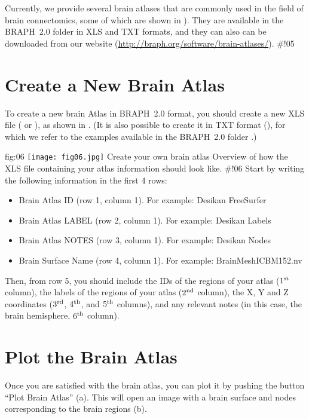 \documentclass[justified]{tufte-handout}
\begin{document}
Currently, we provide several brain atlases that are commonly used in the field of brain connectomics, some of which are shown in ). 
They are available in the BRAPH~2.0 folder  in XLS and TXT formats, and they can also can be downloaded from our website (\url{http://braph.org/software/brain-atlases/}).
#!05
\clearpage
\section{Create a New Brain Atlas}

To create a new brain Atlas in BRAPH~2.0 format, you should create a new XLS file ( or ), as shown in . 
(It is also possible to create it in TXT format (), for which we refer to the examples available in the BRAPH~2.0 folder .)

	{fig:06}
	{\texttt{[image: fig06.jpg]}}
	{Create your own brain atlas}
	{
	Overview of how the XLS file containing your atlas information should look like.
	}
#!06
Start by writing the following information in the first 4 rows:
\begin{itemize}

\item Brain Atlas ID (row 1, column 1). 
For example: Desikan FreeSurfer

\item Brain Atlas LABEL (row 2, column 1). 
For example: Desikan Labels

\item Brain Atlas NOTES (row 3, column 1).
For example: Desikan Nodes

\item Brain Surface Name (row 4, column 1).
For example: BrainMeshICBM152.nv

\end{itemize}
Then, from row 5, you should include the IDs of the regions of your atlas ($1^{\rm st}$ column), the labels of the regions of your atlas ($2^{\rm nd}$ column), the X, Y and Z coordinates ($3^{\rm rd}$, $4^{\rm th}$, and $5^{\rm th}$ columns), and any relevant notes (in this case, the brain hemisphere, $6^{\rm th}$ column).	

\clearpage
\section{Plot the Brain Atlas}

Once you are satisfied with the brain atlas, you can plot it by pushing the button ``Plot Brain Atlas'' (a). 
This will open an image with a brain surface and nodes corresponding to the brain regions (b).
\end{document}

